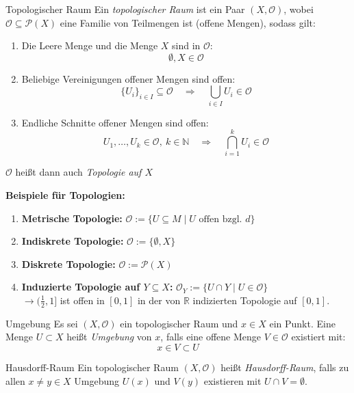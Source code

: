 \begin{definition}{Topologischer Raum}
    Ein \emph{topologischer Raum} ist ein Paar $(X, \mathcal{O})$, wobei $\mathcal{O} \subseteq \mathcal{P}(X)$ eine Familie von Teilmengen ist (offene Mengen), sodass gilt:
    
    \begin{enumerate}
        \item Die Leere Menge und die Menge $X$ sind in $\mathcal{O}$: \\
        $$\emptyset, X \in \mathcal{O}$$
        \item Beliebige Vereinigungen offener Mengen sind offen:
        $$
            \{ U_i \}_{i \in I} \subseteq \mathcal{O} \quad \Rightarrow \quad \bigcup_{i \in I} U_i \in \mathcal{O}
        $$
        \item Endliche Schnitte offener Mengen sind offen:
        $$
            U_1, \dots, U_k \in \mathcal{O},\ k \in \mathbb{N} \quad \Rightarrow \quad \bigcap_{i=1}^k U_i \in \mathcal{O}
        $$
    \end{enumerate}
    
    $\mathcal{O}$ heißt dann auch \emph{Topologie auf $X$}
\end{definition}

\textbf{Beispiele für Topologien:}
\begin{enumerate}
    \item \textbf{Metrische Topologie:} $\mathcal{O} := \{ U \subseteq M \mid U \text{ offen bzgl. } d \}$
    \item \textbf{Indiskrete Topologie:} $\mathcal{O} := \{\emptyset, X\}$
    \item \textbf{Diskrete Topologie:} $\mathcal{O} := \mathcal{P}(X)$
    \item \textbf{Induzierte Topologie auf $Y \subseteq X$:}
    $
        \mathcal{O}_Y := \{ U \cap Y \mid U \in \mathcal{O} \}
    $ \\
    $\rightarrow (\frac{1}{2}, 1]$ ist offen in $[0,1]$ in der von $\mathbb{R}$ indizierten Topologie auf $[0,1]$. 
\end{enumerate} 

\begin{definition}{Umgebung}
Es sei $(X, \mathcal{O})$ ein topologischer Raum und $x \in X$ ein Punkt. Eine Menge $U \subset X$ heißt \emph{Umgebung} von $x$, falls eine offene Menge $V \in \mathcal{O}$ existiert mit:
$$
    x \in V \subset U
$$
\end{definition}

\begin{definition}{Hausdorff-Raum}
    Ein topologischer Raum $(X, \mathcal{O})$ heißt \emph{Hausdorff-Raum}, falls zu allen $x \neq y \in X$ Umgebung $U(x)$ und $V(y)$ existieren mit $U \cap V = \emptyset$.
\end{definition}

